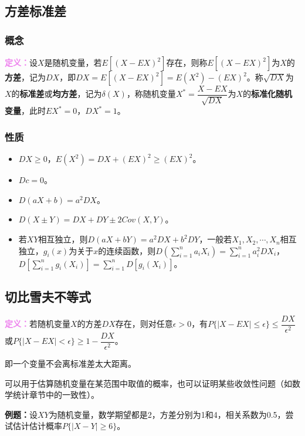 \documentclass[UTF8, 12pt]{ctexart}
\begin{document}
\subsection{方差标准差}

\subsubsection{概念}

\textcolor{violet}{\textbf{定义：}}设$X$是随机变量，若$E[(X-EX)^2]$存在，则称$E[(X-EX)^2]$为$X$的\textbf{方差}，记为$DX$，即$DX=E[(X-EX)^2]=E(X^2)-(EX)^2$。称$\sqrt{DX}$为$X$的\textbf{标准差}或\textbf{均方差}，记为$\delta(X)$，称随机变量$X^*=\dfrac{X-EX}{\sqrt{DX}}$为$X$的\textbf{标准化随机变量}，此时$EX^*=0$，$DX^*=1$。

\subsubsection{性质}

\begin{itemize}
    \item $DX\geqslant0$，$E(X^2)=DX+(EX)^2\geqslant(EX)^2$。
    \item $Dc=0$。
    \item $D(aX+b)=a^2DX$。
    \item $D(X\pm Y)=DX+DY\pm2Cov(X,Y)$。
    \item 若$XY$相互独立，则$D(aX+bY)=a^2DX+b^2DY$，一般若$X_1,X_2,\cdots,X_n$相互独立，$g_i(x)$为关于$x$的连续函数，则$D\left(\sum\limits_{i=1}^na_iX_i\right)=\sum\limits_{i=1}^na_i^2DX_i$，$D\left[\sum\limits_{i=1}^ng_i(X_i)\right]=\sum\limits_{i=1}^nD[g_i(X_i)]$。
\end{itemize}

\subsection{切比雪夫不等式}

\textcolor{violet}{\textbf{定义：}}若随机变量$X$的方差$DX$存在，则对任意$\epsilon>0$，有$P\{\vert X-EX\vert\leqslant\epsilon\}\leqslant\dfrac{DX}{\epsilon^2}$或$P\{\vert X-EX\vert<\epsilon\}\geqslant1-\dfrac{DX}{\epsilon^2}$。

即一个变量不会离标准差太大距离。

可以用于估算随机变量在某范围中取值的概率，也可以证明某些收敛性问题（如数学统计章节中的一致性）。

\textbf{例题：}设$XY$为随机变量，数学期望都是2，方差分别为1和4，相关系数为0.5，尝试估计估计概率$P\{\vert X-Y\vert\geqslant6\}$。
\end{document}
